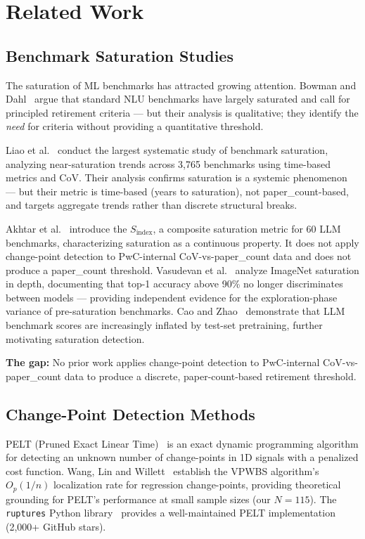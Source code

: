 \section{Related Work}
\label{sec:related}

\subsection{Benchmark Saturation Studies}

The saturation of ML benchmarks has attracted growing attention. Bowman and Dahl~\cite{Bowman2021} argue that standard NLU benchmarks have largely saturated and call for principled retirement criteria --- but their analysis is qualitative; they identify the \textit{need} for criteria without providing a quantitative threshold.

Liao et al.~\cite{Liao2022} conduct the largest systematic study of benchmark saturation, analyzing near-saturation trends across 3,765 benchmarks using time-based metrics and CoV. Their analysis confirms saturation is a systemic phenomenon --- but their metric is time-based (years to saturation), not paper\_count-based, and targets aggregate trends rather than discrete structural breaks.

Akhtar et al.~\cite{Akhtar2026} introduce the $S_{\text{index}}$, a composite saturation metric for 60 LLM benchmarks, characterizing saturation as a continuous property. It does not apply change-point detection to PwC-internal CoV-vs-paper\_count data and does not produce a paper\_count threshold. Vasudevan et al.~\cite{Vasudevan2022} analyze ImageNet saturation in depth, documenting that top-1 accuracy above 90\% no longer discriminates between models --- providing independent evidence for the exploration-phase variance of pre-saturation benchmarks. Cao and Zhao~\cite{Cao2025} demonstrate that LLM benchmark scores are increasingly inflated by test-set pretraining, further motivating saturation detection.

\textbf{The gap:} No prior work applies change-point detection to PwC-internal CoV-vs-paper\_count data to produce a discrete, paper-count-based retirement threshold.

\subsection{Change-Point Detection Methods}

PELT (Pruned Exact Linear Time)~\cite{Killick2012} is an exact dynamic programming algorithm for detecting an unknown number of change-points in 1D signals with a penalized cost function. Wang, Lin and Willett~\cite{Wang2019} establish the VPWBS algorithm's $O_p(1/n)$ localization rate for regression change-points, providing theoretical grounding for PELT's performance at small sample sizes (our $N=115$). The \texttt{ruptures} Python library~\cite{Truong2020} provides a well-maintained PELT implementation (2,000+ GitHub stars).


